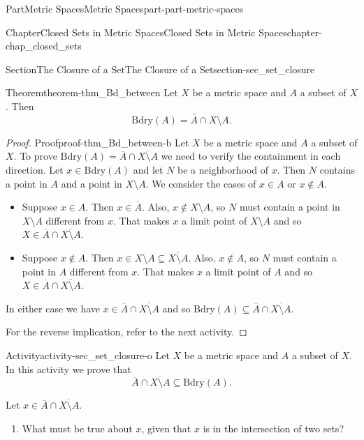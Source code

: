 \documentclass[oneside,10pt,]{book}
\numberwithin{equation}{chapter}
\newcommand{\Bdry}{\text{Bdry}}
\begin{document}
\begin{partptx}{Part}{Metric Spaces}{}{Metric Spaces}{}{}{part-part-metric-spaces}
\begin{chapterptx}{Chapter}{Closed Sets in Metric Spaces}{}{Closed Sets in Metric Spaces}{}{}{chapter-chap_closed_sets}
\begin{sectionptx}{Section}{The Closure of a Set}{}{The Closure of a Set}{}{}{section-sec_set_closure}
\begin{theorem}{Theorem}{}{}{theorem-thm_Bd_between}%
Let \(X\) be a metric space and \(A\) a subset of \(X\). Then%
\begin{equation*}
\Bdry(A) = \overline{A} \cap \overline{X \setminus A}\text{.}
\end{equation*}
%
\end{theorem}
\begin{proof}{Proof}{}{proof-thm_Bd_between-b}
Let \(X\) be a metric space and \(A\) a subset of \(X\). To prove \(\Bdry(A) = \overline{A} \cap \overline{X \setminus A}\) we need to verify the containment in each direction. Let \(x \in \Bdry(A)\) and let \(N\) be a neighborhood of \(x\). Then \(N\) contains a point in \(A\) and a point in \(X \setminus A\). We consider the cases of \(x \in A\) or \(x \notin A\).%
\begin{itemize}[label=\textbullet]
\item{}Suppose \(x \in A\). Then \(x \in \overline{A}\). Also, \(x \notin X \setminus A\), so \(N\) must contain a point in \(X \setminus A\) different from \(x\). That makes \(x\) a limit point of \(X \setminus A\) and so \(X \in \overline{A} \cap \overline{X \setminus A}\).%
\item{}Suppose \(x \notin A\). Then \(x \in X \setminus A \subseteq \overline{X \setminus A}\). Also, \(x \notin A\), so \(N\) must contain a point in \(A\) different from \(x\). That makes \(x\) a limit point of \(A\) and so \(X \in \overline{A} \cap \overline{X \setminus A}\).%
\end{itemize}
%
\par
In either case we have \(x \in \overline{A} \cap \overline{X \setminus A}\) and so \(\Bdry(A) \subseteq \overline{A} \cap \overline{X \setminus A}\).%
\par
For the reverse implication, refer to the next activity.%
\end{proof}
\begin{activity}{Activity}{}{activity-sec_set_closure-o}%
Let \(X\) be a metric space and \(A\) a subset of \(X\). In this activity we prove that%
\begin{equation*}
\overline{A} \cap \overline{X \setminus A} \subseteq \Bdry(A)\text{.}
\end{equation*}
%
\par
Let \(x \in \overline{A} \cap \overline{X \setminus A}\).%
\begin{enumerate}[font=\bfseries,label=(\alph*),ref=\alph*]%
\item{}What must be true about \(x\), given that \(x\) is in the intersection of two sets?%

\end{enumerate}
\end{activity}
\end{sectionptx}
\end{chapterptx}
\end{partptx}
\end{document}
